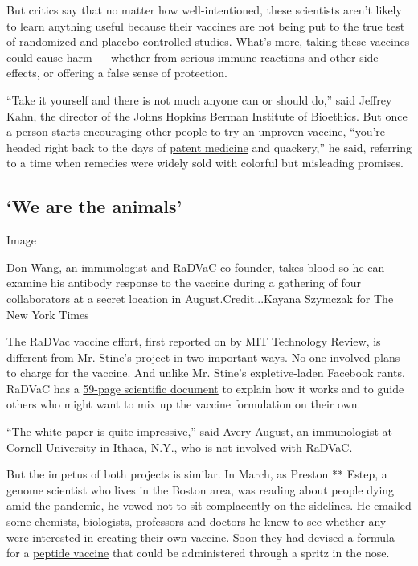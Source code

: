 But critics say that no matter how well-intentioned, these scientists
aren't likely to learn anything useful because their vaccines are not
being put to the true test of randomized and placebo-controlled studies.
What's more, taking these vaccines could cause harm --- whether from
serious immune reactions and other side effects, or offering a false
sense of protection.

``Take it yourself and there is not much anyone can or should do,'' said
Jeffrey Kahn, the director of the Johns Hopkins Berman Institute of
Bioethics. But once a person starts encouraging other people to try an
unproven vaccine, ``you're headed right back to the days of
\href{https://www.hagley.org/research/digital-exhibits/history-patent-medicine}{patent
medicine} and quackery,'' he said, referring to a time when remedies
were widely sold with colorful but misleading promises.

\hypertarget{we-are-the-animals}{%
\subsection{`We are the animals'}\label{we-are-the-animals}}

Image

Don Wang, an immunologist and RaDVaC co-founder, takes blood so he can
examine his antibody response to the vaccine during a gathering of four
collaborators at a secret location in August.Credit...Kayana Szymczak
for The New York Times

The RaDVac vaccine effort, first reported on by
\href{https://www.technologyreview.com/2020/07/29/1005720/george-church-diy-coronavirus-vaccine/}{MIT
Technology Review}, is different from Mr. Stine's project in two
important ways. No one involved plans to charge for the vaccine. And
unlike Mr. Stine's expletive-laden Facebook rants, RaDVaC has a
\href{https://radvac.org/wp-content/uploads/2020/08/White-Paper-SARS-CoV-2-vaccine-ver-3-0-1.pdf}{59-page
scientific document} to explain how it works and to guide others who
might want to mix up the vaccine formulation on their own.

``The white paper is quite impressive,'' said Avery August, an
immunologist at Cornell University in Ithaca, N.Y., who is not involved
with RaDVaC.

But the impetus of both projects is similar. In March, as Preston **
Estep, a genome scientist who lives in the Boston area, was reading
about people dying amid the pandemic, he vowed not to sit complacently
on the sidelines. He emailed some chemists, biologists, professors and
doctors he knew to see whether any were interested in creating their own
vaccine. Soon they had devised a formula for a
\href{https://www.nytimes3xbfgragh.onion/interactive/2020/05/20/science/coronavirus-vaccine-development.html}{peptide
vaccine} that could be administered through a spritz in the nose.

